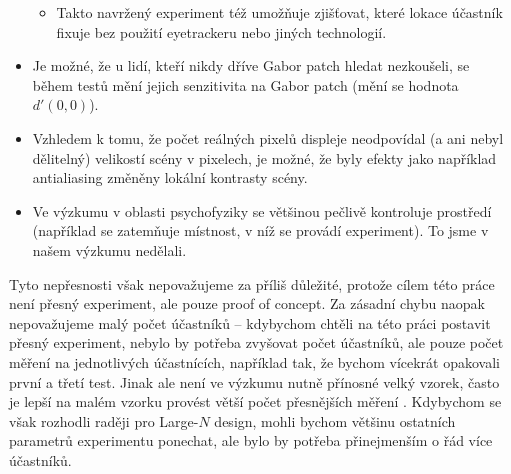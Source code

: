 \begin{itemize}
\begin{itemize}
\item Takto navržený experiment též umožňuje zjišťovat, které lokace účastník
fixuje bez použití eyetrackeru nebo jiných technologií.

\end{itemize}

\item Je možné, že u lidí, kteří nikdy dříve Gabor patch hledat nezkoušeli, se
během testů mění jejich senzitivita na Gabor patch (mění se hodnota $d'(0,0)$).

\item Vzhledem k tomu, že počet reálných pixelů displeje neodpovídal (a ani
nebyl dělitelný) velikostí scény v pixelech, je možné, že byly efekty jako
například antialiasing změněny lokální kontrasty scény.

\item Ve výzkumu v oblasti psychofyziky se většinou
pečlivě kontroluje prostředí (například se zatemňuje místnost, v níž se provádí experiment). To jsme v našem výzkumu nedělali.

\end{itemize}

Tyto nepřesnosti však nepovažujeme za příliš důležité, protože cílem této práce
není přesný experiment, ale pouze proof of concept. Za zásadní chybu naopak
nepovažujeme malý počet účastníků -- kdybychom chtěli na této práci postavit
přesný experiment, nebylo by potřeba zvyšovat počet účastníků, ale pouze počet
měření na jednotlivých účastnících, například tak, že bychom vícekrát opakovali
první a třetí test. Jinak ale není ve výzkumu nutně přínosné velký vzorek,
často je lepší na malém vzorku provést větší počet přesnějších měření
\citep{SmallN}. Kdybychom se však rozhodli raději pro Large-$N$ design, mohli
bychom většinu ostatních parametrů experimentu ponechat, ale bylo by potřeba
přinejmenším o řád více účastníků. 

